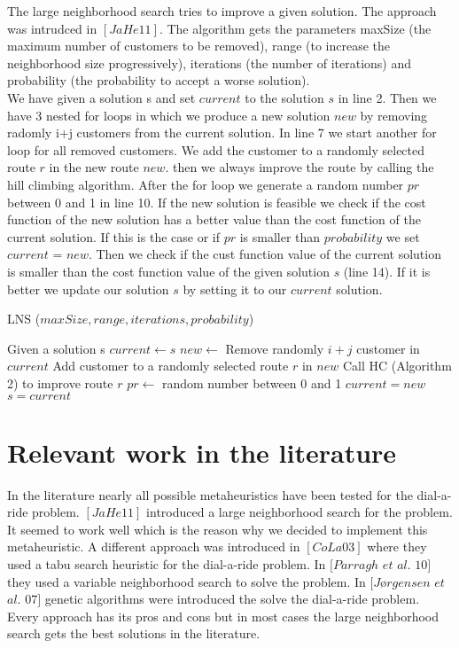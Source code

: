 \documentclass[fleqn]{scrartcl}
\begin{document}
The large neighborhood search tries to improve a given solution. The approach was intrudced in $[JaHe 11]$. The algorithm gets the parameters maxSize (the maximum number of customers to be removed), range (to increase the neighborhood size progressively), iterations (the number of iterations) and probability (the probability to accept a worse solution). \\
We have given a solution s and set $current$ to the solution $s$ in line 2. Then we have 3 nested for loops in which we produce a new solution $new$ by removing radomly i+j customers from the current solution. In line 7 we start another for loop for all removed customers. We add the customer to a randomly selected route $r$ in the new route $new$. then we always improve the route by calling the hill climbing algorithm. After the for loop we generate a random number $pr$ between 0 and 1 in line 10. If the new solution is feasible we check if the cost function of the new solution has a better value than the cost function of the current solution. If this is the case or if $pr$ is smaller than $probability$ we set $current$ = $new$. Then we check if the cust function value of the current solution is smaller than the cost function value of the given solution $s$ (line 14). If it is better we update our solution $s$ by setting it to our $current$ solution.
 
\begin{algorithm}
\caption{LNS ($maxSize, range, iterations, probability$)}\label{lns}
\begin{algorithmic}[1]
\State Given a solution s
\State $current \gets s$
\State $new \gets$ Remove randomly $i+j$ customer in $current$
\State Add customer to a randomly selected route $r$ in $new$
\State Call HC (Algorithm 2) to improve route $r$
\EndFor
\State $pr \gets$ random number between 0 and 1
\State $current = new$
\State $s = current$
\EndIf
\EndIf
\EndIf
\EndFor
\EndFor
\EndFor
\end{algorithmic}
\end{algorithm}
\newpage
\section{Relevant work in the literature}
In the literature nearly all possible metaheuristics have been tested for the dial-a-ride problem. 
$[JaHe 11]$ introduced a large neighborhood search for the problem. It seemed to work well which is the reason why we decided to implement this metaheuristic. A different approach was introduced in $[CoLa 03]$ where they used a tabu search heuristic for the dial-a-ride problem. In $[Parragh$  $et$  $al.$ $10]$ they used a variable neighborhood search to solve the problem. In $[Jørgensen$ $et$ $al.$ $07]$ genetic algorithms were introduced the solve the dial-a-ride problem.
Every approach has its pros and cons but in most cases the large neighborhood search gets the best solutions in the literature.
\newpage
\end{document}
